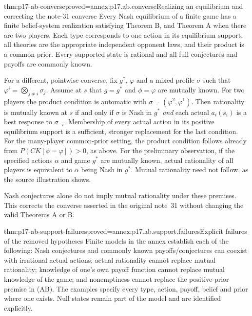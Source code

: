 \begin{hbtheorem}{thm:p17-ab-converse}{proved=annex:p17.ab.converse}{Realizing an equilibrium and correcting the note-31 converse}
Every Nash equilibrium of a finite game has a finite belief-system
realization satisfying Theorem B, and Theorem A when there are two
players. Each type corresponds to one action in its equilibrium
support, all theories are the appropriate independent opponent laws,
and their product is a common prior. Every supported state is rational
and all full conjectures and payoffs are commonly known.

For a different, pointwise converse, fix \(g^*\), \(\varphi\)
and a mixed profile \(\sigma\) such that
\(\varphi^i=\bigotimes_{j\ne i}\sigma_j\).
Assume at \(s\) that \(g=g^*\) and \(\phi=\varphi\)
are mutually known. For two players the product condition is
automatic with \(\sigma=(\varphi^2,\varphi^1)\).
Then rationality is mutually known at \(s\) if and only if
\(\sigma\) is Nash in \(g^*\) \emph{and} each actual \(a_i(s_i)\)
is a best response to \(\sigma_{-i}\).
Membership of every actual action in its positive equilibrium support
is a sufficient, stronger replacement for the last condition.
For the many-player common-prior setting, the product condition
follows already from \(P(CK[\phi=\varphi])>0\), as above.
For the preliminary observation, if the specified actions \(\alpha\)
and game \(g^*\) are mutually known, actual rationality of all
players is equivalent to \(\alpha\) being Nash in \(g^*\).
Mutual rationality need not follow, as the source illustration shows.

Nash conjectures alone do not imply mutual rationality under these
premises. This corrects the converse asserted in the original
note~31 without changing the valid Theorems A or B.
\end{hbtheorem}

\begin{hbtheorem}{thm:p17-ab-support-failures}{proved=annex:p17.ab.support.failures}{Explicit failures of the removed hypotheses}
Finite models in the annex establish each of the following:
Nash conjectures and commonly known payoffs/conjectures can coexist
with irrational actual actions; actual rationality cannot replace
mutual rationality; knowledge of one's own payoff function cannot
replace mutual knowledge of the game; and nonemptiness cannot replace
the positive-prior premise in (AB).
The examples specify every type, action, payoff, belief and prior
where one exists. Null states remain part of the model and are
identified explicitly.
\end{hbtheorem}

